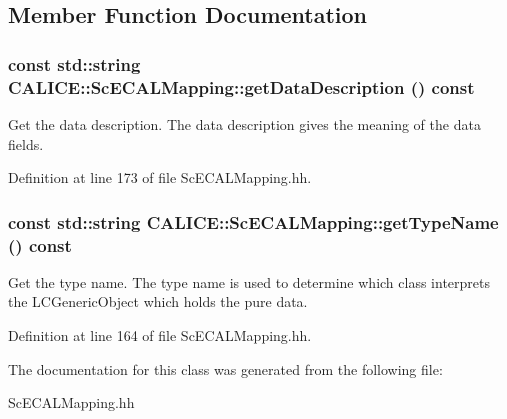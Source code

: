 \subsection{Member Function Documentation}
\subsubsection[{getDataDescription}]{\setlength{\rightskip}{0pt plus 5cm}const std::string CALICE::ScECALMapping::getDataDescription () const\hspace{0.3cm}{\ttfamily  [inline]}}\label{classCALICE_1_1ScECALMapping_a8b7b021d4aa4b0439def634c5e642612}


Get the data description. The data description gives the meaning of the data fields. 

Definition at line 173 of file ScECALMapping.hh.
\subsubsection[{getTypeName}]{\setlength{\rightskip}{0pt plus 5cm}const std::string CALICE::ScECALMapping::getTypeName () const\hspace{0.3cm}{\ttfamily  [inline]}}\label{classCALICE_1_1ScECALMapping_a4230c9d08db0e23b8eb321edb8b6782a}


Get the type name. The type name is used to determine which class interprets the LCGenericObject which holds the pure data. 

Definition at line 164 of file ScECALMapping.hh.

The documentation for this class was generated from the following file:\begin{DoxyCompactItemize}
\item 
ScECALMapping.hh\end{DoxyCompactItemize}
